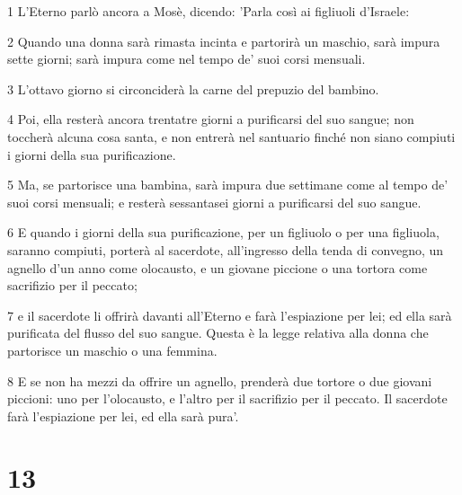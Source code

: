 \par 1 L'Eterno parlò ancora a Mosè, dicendo: 'Parla così ai figliuoli d'Israele:
\par 2 Quando una donna sarà rimasta incinta e partorirà un maschio, sarà impura sette giorni; sarà impura come nel tempo de' suoi corsi mensuali.
\par 3 L'ottavo giorno si circonciderà la carne del prepuzio del bambino.
\par 4 Poi, ella resterà ancora trentatre giorni a purificarsi del suo sangue; non toccherà alcuna cosa santa, e non entrerà nel santuario finché non siano compiuti i giorni della sua purificazione.
\par 5 Ma, se partorisce una bambina, sarà impura due settimane come al tempo de' suoi corsi mensuali; e resterà sessantasei giorni a purificarsi del suo sangue.
\par 6 E quando i giorni della sua purificazione, per un figliuolo o per una figliuola, saranno compiuti, porterà al sacerdote, all'ingresso della tenda di convegno, un agnello d'un anno come olocausto, e un giovane piccione o una tortora come sacrifizio per il peccato;
\par 7 e il sacerdote li offrirà davanti all'Eterno e farà l'espiazione per lei; ed ella sarà purificata del flusso del suo sangue. Questa è la legge relativa alla donna che partorisce un maschio o una femmina.
\par 8 E se non ha mezzi da offrire un agnello, prenderà due tortore o due giovani piccioni: uno per l'olocausto, e l'altro per il sacrifizio per il peccato. Il sacerdote farà l'espiazione per lei, ed ella sarà pura'.

\chapter{13}

